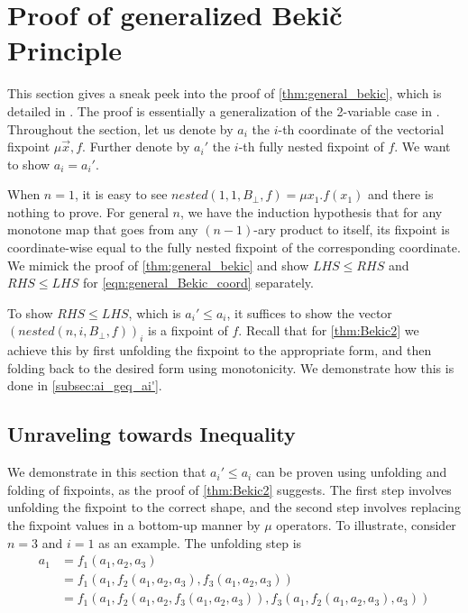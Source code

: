 \section{Proof of generalized Beki\v{c} Principle}
\label{sec:math_proof}
This section gives a sneak peek into the proof of \autoref{thm:general_bekic}, which is detailed in \cite{xu2025}. The proof is essentially a generalization of the 2-variable case in \cite{arnold2001rudiments}. Throughout the section, let us denote by $a_i$ the $i$-th coordinate of the vectorial fixpoint $\mu\vec{x},f$. Further denote by $a_i'$ the $i$-th fully nested fixpoint of $f$. We want to show $a_i=a_i'$.

When $n=1$, it is easy to see $nested(1,1,B_\bot,f) = \mu x_1. f(x_1)$ and there is nothing to prove. For general $n$, we have the induction hypothesis that for any monotone map that goes from any $(n-1)$-ary product to itself, its fixpoint is coordinate-wise equal to the fully nested fixpoint of the corresponding coordinate. We mimick the proof of \autoref{thm:general_bekic} and show $LHS \leq RHS$ and $RHS \leq LHS$ for \autoref{eqn:general_Bekic_coord} separately.

To show $RHS \leq LHS$, which is $a_i' \leq a_i$, it suffices to show the vector $(nested(n,i,B_\bot,f))_i$ is a fixpoint of $f$. Recall that for \autoref{thm:Bekic2} we achieve this by first unfolding the fixpoint to the appropriate form, and then folding back to the desired form using monotonicity. We demonstrate how this is done in \autoref{subsec:ai_geq_ai'}.

\subsection{Unraveling towards Inequality}
\label{subsec:ai_geq_ai'}
We demonstrate in this section that $a_i' \leq a_i$ can be proven using unfolding and folding of fixpoints, as the proof of \autoref{thm:Bekic2} suggests. The first step involves unfolding the fixpoint to the correct shape, and the second step involves replacing the fixpoint values in a bottom-up manner by $\mu$ operators. To illustrate, consider $n=3$ and $i=1$ as an example. The unfolding step is
\begin{align*}
    a_1 &= f_1(a_1,a_2,a_3) \\
        &= f_1(a_1,f_2(a_1,a_2,a_3), f_3(a_1,a_2,a_3)) \\
        &= f_1(a_1,f_2(a_1,a_2,f_3(a_1,a_2,a_3)), f_3(a_1,f_2(a_1,a_2,a_3),a_3))
\end{align*}

